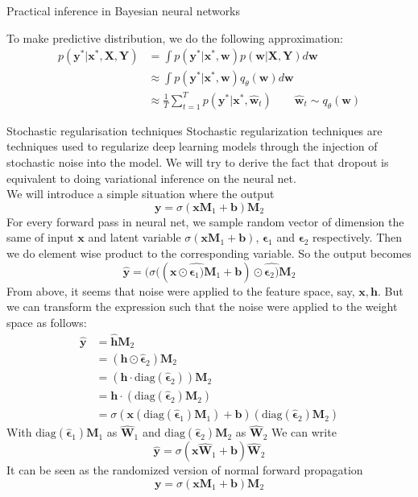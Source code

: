 \documentclass{beamer}
\begin{document}
\begin{frame}[allowframebreaks]{Practical inference in Bayesian neural networks}
\framebreak

To make predictive distribution, we do the following approximation:
\begin{align*}
p(\mathbf{y}^\ast | \mathbf{x}^\ast, \mathbf{X}, \mathbf{Y}) & = \int p(\mathbf{y}^\ast | \mathbf{x}^\ast, \mathbf{w}) p(\mathbf{w} | \mathbf{X}, \mathbf{Y}) d\mathbf{w} \\ 
& \approx \int p(\mathbf{y}^\ast | \mathbf{x}^\ast, \mathbf{w}) q_\theta(\mathbf{w})d\mathbf{w} \\ 
& \approx \frac{1}{T} \sum_{t=1}^T p(\mathbf{y}^\ast | \mathbf{x}^\ast, \hat{\mathbf{w}}_t)  \qquad \hat{\mathbf{w}}_t \sim q_\theta(\mathbf{w})
\end{align*}

\end{frame}

\begin{frame}[allowframebreaks]{Stochastic regularisation techniques}
Stochastic regularization techniques are techniques used to regularize deep learning models through the injection of stochastic noise into the model. We will try to derive the fact that dropout is equivalent to doing variational inference on the neural net. \\

We will introduce a simple situation where the output $$\mathbf{y} = \sigma(\mathbf{x} \mathbf{M}_1 + \mathbf{b})\mathbf{M}_2$$ For every forward pass in neural net, we sample random vector of dimension the same of input $\mathbf{x}$ and latent variable $\sigma(\mathbf{x} \mathbf{M}_1 + \mathbf{b})$, $\bm{\epsilon}_1$ and $\bm{\epsilon}_2$ respectively. Then we do element wise product to the corresponding variable. So the output becomes 
$$\hat{\mathbf{y}} = (\sigma((\mathbf{x} \odot \hat{\bm{\epsilon}_1)} \mathbf{M}_1 + \mathbf{b}) \odot \hat{\bm{\epsilon}_2)} \mathbf{M}_2$$
From above, it seems that noise were applied to the feature space, say, $\mathbf{x}, \mathbf{h}$. But we can transform the expression such that the noise were applied to the weight space as follows:
\begin{align*}
\hat{\mathbf{y}} & = \hat{\mathbf{h}} \mathbf{M}_2 \\ 
& = (\mathbf{h} \odot \hat{\bm{\epsilon}}_2) \mathbf{M}_2 \\ 
& = (\mathbf{h} \cdot \text{diag}(\hat{\bm{\epsilon}}_2)) \mathbf{M}_2 \\ 
& = \mathbf{h} \cdot (\text{diag}(\hat{\bm{\epsilon}}_2) \mathbf{M}_2) \\ 
& = \sigma(\mathbf{x} (\text{diag}(\hat{\bm{\epsilon}}_1) \mathbf{M}_1) + \mathbf{b}) (\text{diag}(\hat{\bm{\epsilon}}_2) \mathbf{M}_2)
\end{align*}
With $\text{diag}(\hat{\bm{\epsilon}}_1) \mathbf{M}_1$ as $\hat{\mathbf{W}}_1$ and $\text{diag}(\hat{\bm{\epsilon}}_2) \mathbf{M}_2$ as $\hat{\mathbf{W}}_2$
We can write 
$$\hat{\mathbf{y}} = \sigma(\mathbf{x} \hat{\mathbf{W}}_1 + \mathbf{b}) \hat{\mathbf{W}}_2$$
It can be seen as the randomized version of normal forward propagation
$$\mathbf{y} = \sigma(\mathbf{x} \mathbf{M}_1 + \mathbf{b}) \mathbf{M}_2$$


\end{frame}
\end{document}
